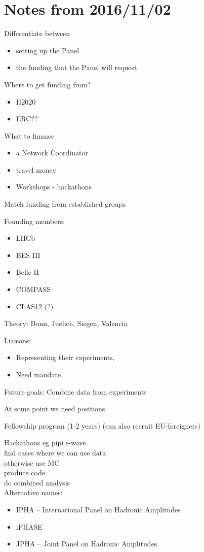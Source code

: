 \appendix
\section{Notes from 2016/11/02}
Differentiate between 
\begin{itemize}
\item setting up the Panel
\item the funding that the Panel will request
\end{itemize}

Where to get funding from?
\begin{itemize}
\item H2020
\item ERC??
\end{itemize}

What to finance
\begin{itemize}
\item a Network Coordinator
\item travel money
\item Workshops - hackathons
\end{itemize}

Match funding from established groups

Founding members:
\begin{itemize}
\item LHCb
\item BES III
\item Belle II
\item COMPASS
\item CLAS12 (?)
\end{itemize}

Theory: Bonn, Juelich, Siegen, Valencia 

Liaisons:
\begin{itemize}
\item Representing their experiments,
\item Need mandate
\end{itemize}

Future goals:
Combine data from experiments

At some point we need positions

Fellowship program (1-2 years) (can also recruit EU-foreigners)

Hackathons
eg pipi s-wave\\
find cases where we can use data\\
otherwise use MC\\
produce code\\
do combined analysis\\

Alternative names:
\begin{itemize}
\item IPHA -- International Panel on Hadronic Amplitudes
\item iPHASE
\item JPHA -- Joint Panel on Hadronic Amplitudes
\end{itemize}
